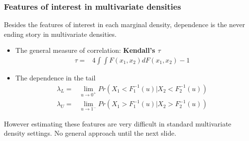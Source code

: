 \documentclass{beamer}
\begin{document}
\begin{frame}
  \frametitle{Features of interest in multivariate densities}

Besides the features of interest in each marginal density, dependence is the
never ending story in multivariate densities.

  \begin{itemize}
  \item The general measure of correlation: \textbf{Kendall's $\tau$}
    \begin{equation*}
      \begin{split}
        \tau = & 4 \int \int F(x_1, x_2)dF(x_1,x_2)-1%
      \end{split}
    \end{equation*}

  \item The dependence in the tail
    \begin{equation*}
      \begin{split}
        \lambda_L = & \lim \limits_{u \to 0^{+}} Pr(X_1< F_1^{-1}(u)| X_2<F_2^{-1}(u))\\%
        \lambda_U=&\lim \limits_{u \to 1^{-}} Pr(X_1> F_1^{-1}(u)|
        X_2>F_2^{-1}(u))%
      \end{split}
    \end{equation*}
  \end{itemize}
However estimating these features are very difficult in standard multivariate
density settings. No general approach until the next slide.

\end{frame}
\end{document}
